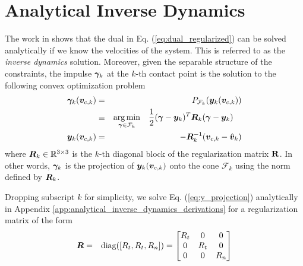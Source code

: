 \section{Analytical Inverse Dynamics}
\label{sec:analytical_inverse_dynamics}

The work in \cite{bib:todorov2014} shows that the dual in Eq.
(\ref{eq:dual_regularized}) can be solved analytically if we know the velocities
of the system. This is referred to as the \textit{inverse dynamics} solution.
Moreover, given the separable structure of the constraints, the impulse
${\bm\gamma}_k$ at the $k\text{-th}$ contact point is the solution to the following
convex optimization problem
\begin{eqnarray}
	\bgamma_k(\vf{v}_{c,k})&=& P_{\mathcal{F}_k}(\vf{y}_k(\vf{v}_{c,k})) \nonumber\\
	&=&\begin{aligned}
		\argmin_{\bgamma\in\mathcal{F}_k} \quad &
	\frac{1}{2}(\bgamma-\vf{y}_k)^T\vf{R}_k(\bgamma-\vf{y}_k) \end{aligned}
    \label{eq:y_projection}\\
	\vf{y}_k(\vf{v}_{c,k}) &=& -\vf{R}_k^{-1}(\vf{v}_{c,k}-\hat{\vf{v}}_k)    
\end{eqnarray}
where ${\bm{R}}_k\in\mathbb{R}^{3\times3}$ is the $k\text{-th}$ diagonal block of
the regularization matrix ${\mathbf{R}}$. In other words, ${\bm\gamma}_k$ is the projection of ${\bm{y}}_k({\bm{v}}_{c,k})$ onto
the cone $\mathcal{F}_k$ using the norm defined by ${\bm{R}}_k$.


Dropping subscript $k$ for simplicity, we solve Eq. (\ref{eq:y_projection})
analytically in Appendix \ref{app:analytical_inverse_dynamics_derivations} for a
regularization matrix of the form
\begin{eqnarray}	
	\vf{R} &=& \text{diag}([R_t, R_t, R_n]) = 
	\begin{bmatrix}
		R_t &   0 & 0\\
		  0 & R_t & 0\\
		  0 &   0 & R_n
	\end{bmatrix}
    \label{eq:Rk}
\end{eqnarray} 

